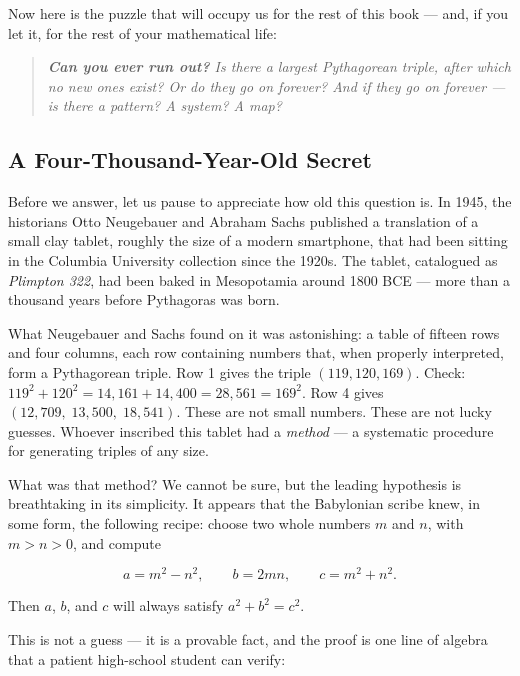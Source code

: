 Now here is the puzzle that will occupy us for the rest of this book --- and, if you let it, for the rest of your mathematical life:

\begin{quote}
\itshape \textbf{Can you ever run out?} Is there a largest Pythagorean triple, after which no new ones exist? Or do they go on forever? And if they go on forever --- is there a \textit{pattern}? A system? A map?
\end{quote}


\bigskip


\subsection*{A Four-Thousand-Year-Old Secret}

Before we answer, let us pause to appreciate how old this question is. In 1945, the historians Otto Neugebauer and Abraham Sachs published a translation of a small clay tablet, roughly the size of a modern smartphone, that had been sitting in the Columbia University collection since the 1920s. The tablet, catalogued as \textit{Plimpton 322}, had been baked in Mesopotamia around 1800 BCE --- more than a thousand years before Pythagoras was born.

What Neugebauer and Sachs found on it was astonishing: a table of fifteen rows and four columns, each row containing numbers that, when properly interpreted, form a Pythagorean triple. Row 1 gives the triple $(119, 120, 169)$. Check: $119^2 + 120^2 = 14{,}161 + 14{,}400 = 28{,}561 = 169^2$. Row 4 gives $(12{,}709,\; 13{,}500,\; 18{,}541)$. These are not small numbers. These are not lucky guesses. Whoever inscribed this tablet had a \textit{method} --- a systematic procedure for generating triples of any size.

What was that method? We cannot be sure, but the leading hypothesis is breathtaking in its simplicity. It appears that the Babylonian scribe knew, in some form, the following recipe: choose two whole numbers $m$ and $n$, with $m > n > 0$, and compute

\[
a = m^2 - n^2, \qquad b = 2mn, \qquad c = m^2 + n^2.
\]

Then $a$, $b$, and $c$ will always satisfy $a^2 + b^2 = c^2$.

This is not a guess --- it is a provable fact, and the proof is one line of algebra that a patient high-school student can verify:

